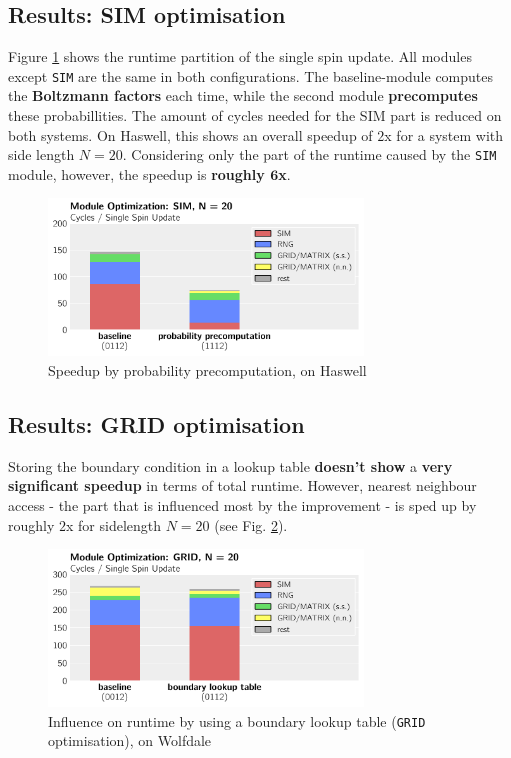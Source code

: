 \documentclass[letterpaper]{article}
\begin{document}
\subsection{Results: SIM optimisation} \label{res:SIM}
Figure \ref{SIM:Has:20} shows the runtime partition of the single spin update. All modules except \texttt{SIM} are the same in both configurations. The baseline-module computes the \textbf{Boltzmann factors} each time, while the second module \textbf{precomputes} these probabillities. The amount of cycles needed for the SIM part is reduced on both systems. On Haswell, this shows an overall speedup of $2$x for a system with side length $N = 20$. Considering only the part of the runtime caused by the \texttt{SIM} module, however, the speedup is \textbf{roughly $\mathbf{6}$x}.
	\begin{figure}[h]\centering
	  \includegraphics[width = 8.36cm]{plots/dg_20_2.pdf}
	  \caption{Speedup by probability precomputation, on Haswell}
	  \label{SIM:Has:20}
	\end{figure}
\subsection{Results: GRID optimisation}
Storing the boundary condition in a lookup table \textbf{doesn't show} a \textbf{very significant speedup} in terms of total runtime. However, nearest neighbour access - the part that is influenced most by the improvement - is sped up by roughly $2$x for sidelength $N = 20$ (see Fig. \ref{GRID:Wolf:20}).
	\begin{figure}[h]\centering
	  \includegraphics[width = 8.36cm]{plots/msk_20_1.pdf}
	  \caption{Influence on runtime by using a boundary lookup table (\texttt{GRID} optimisation), on Wolfdale}
	  \label{GRID:Wolf:20}
	\end{figure}
\end{document}
